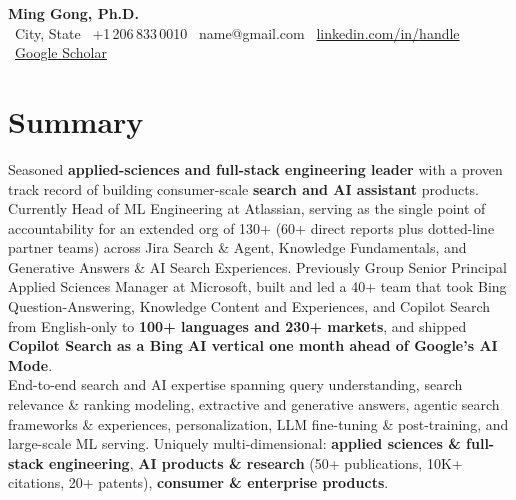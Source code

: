 \documentclass[10.5pt,letterpaper]{article}
\begin{document}
\begin{center}
  {\LARGE\bfseries\color{blue!60!black} Ming Gong, Ph.D.}\\[3pt]
  \faMapMarker* \ {{City, State}} \quad \textbar \quad
  \faPhone \ +1\,206\,833\,0010 \quad \textbar \quad
  \faEnvelope \ {{name@gmail.com}} \quad \textbar \quad
  \faLinkedin \ \href{https://linkedin.com/in/{{handle}}}{linkedin.com/in/{{handle}}} \quad \textbar \quad
  \faGraduationCap \ \href{https://scholar.google.com/citations?user=c7JEFwsAAAAJ}{Google Scholar}
\end{center}

\section*{Summary}
Seasoned \textbf{applied-sciences and full-stack engineering leader} with a proven track record of building consumer-scale \textbf{search and AI assistant} products. Currently Head of ML Engineering at Atlassian, serving as the single point of accountability for an extended org of 130+ (60+ direct reports plus dotted-line partner teams) across Jira Search \& Agent, Knowledge Fundamentals, and Generative Answers \& AI Search Experiences. Previously Group Senior Principal Applied Sciences Manager at Microsoft, built and led a 40+ team that took Bing Question-Answering, Knowledge Content and Experiences, and Copilot Search from English-only to \textbf{100+ languages and 230+ markets}, and shipped \textbf{Copilot Search as a Bing AI vertical one month ahead of Google's AI Mode}.\\[4pt]
End-to-end search and AI expertise spanning query understanding, search relevance \& ranking modeling, extractive and generative answers, agentic search frameworks \& experiences, personalization, LLM fine-tuning \& post-training, and large-scale ML serving. Uniquely multi-dimensional: \textbf{applied sciences \& full-stack engineering}, \textbf{AI products \& research} (50+ publications, 10K+ citations, 20+ patents), \textbf{consumer \& enterprise products}.

\end{document}

